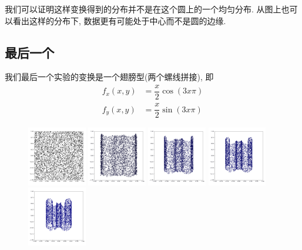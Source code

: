 \documentclass[lang=cn,11pt]{elegantpaper}
\begin{document}
我们可以证明这样变换得到的分布并不是在这个圆上的一个均匀分布. 从图上也可以看出这样的分布下, 数据更有可能处于中心而不是圆的边缘.

\subsection{最后一个}

我们最后一个实验的变换是一个翅膀型(两个螺线拼接), 即
\begin{align}
	f_x(x,y) &= \dfrac{x}{2} \cos (3x\pi) \\
	f_y(x,y) &= \dfrac{x}{2} \sin (3x\pi)
\end{align}

\begin{figure}[hbt]
\centering
  \includegraphics[width=0.23\textwidth]{wings_1_1}
  \includegraphics[width=0.23\textwidth]{wings_1_2}
  \includegraphics[width=0.23\textwidth]{wings_1_3}
  \includegraphics[width=0.23\textwidth]{wings_1_4}
  \includegraphics[width=0.23\textwidth]{wings_1_5}

\end{figure}
\end{document}
